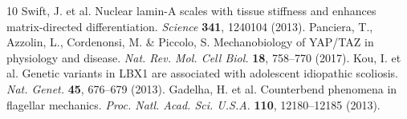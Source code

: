 \documentclass[12pt]{article}
\begin{document}
\begin{thebibliography}{10}
 Swift, J. et al. Nuclear lamin-A scales with tissue stiffness and enhances matrix-directed differentiation. \textit{Science} \textbf{341}, 1240104 (2013).
 Panciera, T., Azzolin, L., Cordenonsi, M. \& Piccolo, S. Mechanobiology of YAP/TAZ in physiology and disease. \textit{Nat. Rev. Mol. Cell Biol.} \textbf{18}, 758–770 (2017).
 Kou, I. et al. Genetic variants in LBX1 are associated with adolescent idiopathic scoliosis. \textit{Nat. Genet.} \textbf{45}, 676–679 (2013).
 Gadelha, H. et al. Counterbend phenomena in flagellar mechanics. \textit{Proc. Natl. Acad. Sci. U.S.A.} \textbf{110}, 12180–12185 (2013).
\end{thebibliography}
\end{document}
